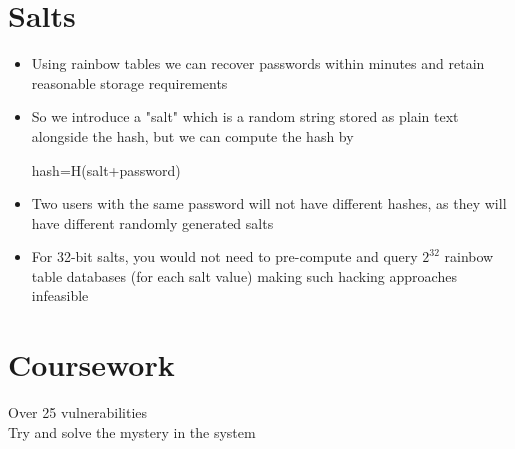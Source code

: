 \documentclass{article}[18pt]
\begin{document}
\section{Salts}
\begin{itemize}
	\item Using rainbow tables we can recover passwords within minutes and retain reasonable storage requirements
	\item So we introduce a "salt" which is a random string stored as plain text alongside the hash, but we can compute the hash by
	\begin{center}
		hash=H(salt+password)
	\end{center}
	\item Two users with the same password will not have different hashes, as they will have different randomly generated salts
	\item For 32-bit salts, you would not need to pre-compute and query $2^{32}$ rainbow table databases (for each salt value) making such hacking approaches infeasible
\end{itemize}
\section{Coursework}
Over 25 vulnerabilities \\
Try and solve the mystery in the system
\end{document}
